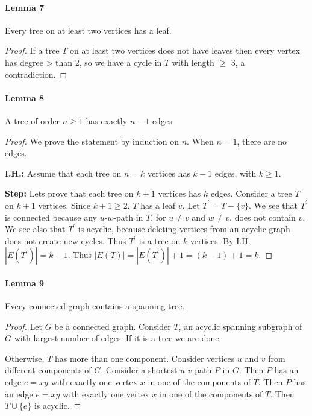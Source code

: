 \paragraph{Lemma 7} Every tree on at least two vertices has a leaf.
\begin{proof}
    If a tree $ T $ on at least two vertices does not have leaves
    then every vertex has degree > than 2, so we have a cycle in $ T $ 
    with length $ \geq $ 3, a contradiction.
\end{proof}

\paragraph{Lemma 8} A tree of order $ n \geq 1 $ has exactly $ n - 1 $ edges.
\begin{proof}
    We prove the statement by induction on $ n$. When $ n = 1$, there are no edges.

    \smallskip
    \noindent\textbf{I.H.:} Assume that each tree on $ n = k $ vertices has 
    $ k - 1 $ edges, with $ k \geq 1 $.
    
    \smallskip
    \noindent\textbf{Step:} Lets prove that each tree on $ k+1 $ vertices has $ k $ edges.
    Consider a tree $ T $ on $ k + 1 $ vertices. Since $ k + 1 \geq 2 $, $ T $ has 
    a leaf $ v $. Let $ T^\prime = T - \{v\}$. We see that $ T^\prime $ is connected
    because any $u$-$w$-path in $ T $, for $ u \neq v $ and $ w \neq v $, does not 
    contain $ v $. We see also that $ T^\prime $ is acyclic, because deleting 
    vertices from an acyclic graph does not create new cycles. Thus $ T^\prime $ 
    is a tree on $ k $ vertices. By I.H. $ |E(T^\prime)| = k-1$. Thus 
    $ |E(T)| = |E(T^\prime)| + 1 = (k-1)+1 = k.$

\end{proof}

\paragraph{Lemma 9} Every connected graph contains a spanning tree.
\begin{proof}
    Let $ G $ be a connected graph. Consider $ T $, an acyclic spanning subgraph of 
    $ G $ with largest number of edges. If it is a tree we are done.

    \smallskip
    Otherwise, $ T $ has more than one component. Consider vertices $ u $ and 
    $ v $ from different components of $ G$. Consider a shortest $u$-$v$-path $ P $
    in $ G$. Then $ P $ has an edge $ e = xy $ with exactly one vertex $ x $ in 
    one of the components of $ T$. Then $ P $ has an edge $ e = xy $ with exactly
    one vertex $ x $ in one of the components of $ T$. Then $ T \cup \{e\} $ is 
    acyclic. 
\end{proof}

